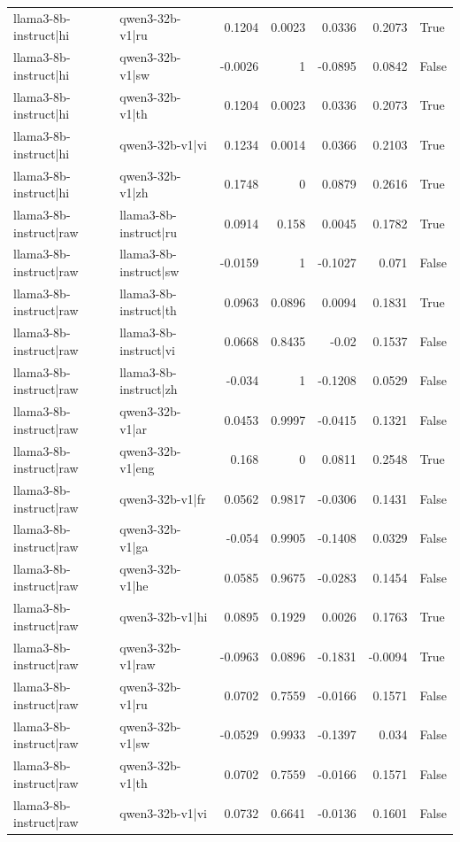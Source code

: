 \begin{table}
\begin{tabular}{l l r r r r l}
llama3-8b-instruct|hi & qwen3-32b-v1|ru & 0.1204 & 0.0023 & 0.0336 & 0.2073 & True \\
llama3-8b-instruct|hi & qwen3-32b-v1|sw & -0.0026 & 1 & -0.0895 & 0.0842 & False \\
llama3-8b-instruct|hi & qwen3-32b-v1|th & 0.1204 & 0.0023 & 0.0336 & 0.2073 & True \\
llama3-8b-instruct|hi & qwen3-32b-v1|vi & 0.1234 & 0.0014 & 0.0366 & 0.2103 & True \\
llama3-8b-instruct|hi & qwen3-32b-v1|zh & 0.1748 & 0 & 0.0879 & 0.2616 & True \\
llama3-8b-instruct|raw & llama3-8b-instruct|ru & 0.0914 & 0.158 & 0.0045 & 0.1782 & True \\
llama3-8b-instruct|raw & llama3-8b-instruct|sw & -0.0159 & 1 & -0.1027 & 0.071 & False \\
llama3-8b-instruct|raw & llama3-8b-instruct|th & 0.0963 & 0.0896 & 0.0094 & 0.1831 & True \\
llama3-8b-instruct|raw & llama3-8b-instruct|vi & 0.0668 & 0.8435 & -0.02 & 0.1537 & False \\
llama3-8b-instruct|raw & llama3-8b-instruct|zh & -0.034 & 1 & -0.1208 & 0.0529 & False \\
llama3-8b-instruct|raw & qwen3-32b-v1|ar & 0.0453 & 0.9997 & -0.0415 & 0.1321 & False \\
llama3-8b-instruct|raw & qwen3-32b-v1|eng & 0.168 & 0 & 0.0811 & 0.2548 & True \\
llama3-8b-instruct|raw & qwen3-32b-v1|fr & 0.0562 & 0.9817 & -0.0306 & 0.1431 & False \\
llama3-8b-instruct|raw & qwen3-32b-v1|ga & -0.054 & 0.9905 & -0.1408 & 0.0329 & False \\
llama3-8b-instruct|raw & qwen3-32b-v1|he & 0.0585 & 0.9675 & -0.0283 & 0.1454 & False \\
llama3-8b-instruct|raw & qwen3-32b-v1|hi & 0.0895 & 0.1929 & 0.0026 & 0.1763 & True \\
llama3-8b-instruct|raw & qwen3-32b-v1|raw & -0.0963 & 0.0896 & -0.1831 & -0.0094 & True \\
llama3-8b-instruct|raw & qwen3-32b-v1|ru & 0.0702 & 0.7559 & -0.0166 & 0.1571 & False \\
llama3-8b-instruct|raw & qwen3-32b-v1|sw & -0.0529 & 0.9933 & -0.1397 & 0.034 & False \\
llama3-8b-instruct|raw & qwen3-32b-v1|th & 0.0702 & 0.7559 & -0.0166 & 0.1571 & False \\
llama3-8b-instruct|raw & qwen3-32b-v1|vi & 0.0732 & 0.6641 & -0.0136 & 0.1601 & False \\

\end{tabular}
\end{table}
